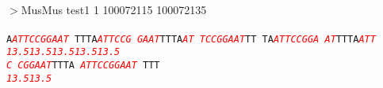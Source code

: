 \documentclass[11pt,twoside,reqno,a4paper]{article}
\begin{document}
\\
$>$MusMus	test1	1	100072115	100072135 \\
 \\
\texttt{A\textit{\textcolor{red}{A}}\textit{\textcolor{red}{T}}\textit{\textcolor{red}{T}}\textit{\textcolor{red}{C}}\textit{\textcolor{red}{C}}\textit{\textcolor{red}{G}}\textit{\textcolor{red}{G}}\textit{\textcolor{red}{A}}\textit{\textcolor{red}{A}}\textit{\textcolor{red}{T}}	TTTA\textit{\textcolor{red}{A}}\textit{\textcolor{red}{T}}\textit{\textcolor{red}{T}}\textit{\textcolor{red}{C}}\textit{\textcolor{red}{C}}\textit{\textcolor{red}{G}}	\textit{\textcolor{red}{G}}\textit{\textcolor{red}{A}}\textit{\textcolor{red}{A}}\textit{\textcolor{red}{T}}TTTA\textit{\textcolor{red}{A}}\textit{\textcolor{red}{T}}	\textit{\textcolor{red}{T}}\textit{\textcolor{red}{C}}\textit{\textcolor{red}{C}}\textit{\textcolor{red}{G}}\textit{\textcolor{red}{G}}\textit{\textcolor{red}{A}}\textit{\textcolor{red}{A}}\textit{\textcolor{red}{T}}TT	TA\textit{\textcolor{red}{A}}\textit{\textcolor{red}{T}}\textit{\textcolor{red}{T}}\textit{\textcolor{red}{C}}\textit{\textcolor{red}{C}}\textit{\textcolor{red}{G}}\textit{\textcolor{red}{G}}\textit{\textcolor{red}{A}}	\textit{\textcolor{red}{A}}\textit{\textcolor{red}{T}}TTTA\textit{\textcolor{red}{A}}\textit{\textcolor{red}{T}}\textit{\textcolor{red}{T}}\\
\hspace*{1\charwidth}\textit{\textcolor{red}{13.5}}\hspace*{1\charwidth}\hspace*{10\charwidth}\textit{\textcolor{red}{13.5}}\hspace*{1\charwidth}\hspace*{10\charwidth}\textit{\textcolor{red}{13.5}}\hspace*{1\charwidth}\hspace*{1\charwidth}\hspace*{10\charwidth}\textit{\textcolor{red}{13.5}}\hspace*{1\charwidth}\hspace*{10\charwidth}\textit{\textcolor{red}{13.5}}\hspace*{1\charwidth}\\
\textit{\textcolor{red}{C}}	\textit{\textcolor{red}{C}}\textit{\textcolor{red}{G}}\textit{\textcolor{red}{G}}\textit{\textcolor{red}{A}}\textit{\textcolor{red}{A}}\textit{\textcolor{red}{T}}TTTA	\textit{\textcolor{red}{A}}\textit{\textcolor{red}{T}}\textit{\textcolor{red}{T}}\textit{\textcolor{red}{C}}\textit{\textcolor{red}{C}}\textit{\textcolor{red}{G}}\textit{\textcolor{red}{G}}\textit{\textcolor{red}{A}}\textit{\textcolor{red}{A}}\textit{\textcolor{red}{T}}	TTT\\
\hspace*{0\charwidth}\textit{\textcolor{red}{13.5}}\hspace*{1\charwidth}\hspace*{1\charwidth}\hspace*{7\charwidth}\textit{\textcolor{red}{13.5}}\hspace*{1\charwidth}\\
}
\\
\end{document}

